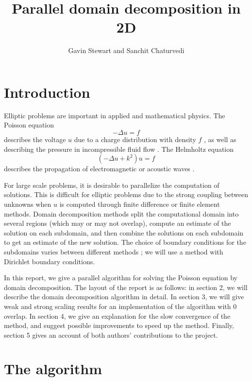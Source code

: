 \documentclass{article}
\title{Parallel domain decomposition in 2D}
\author{Gavin Stewart and Sanchit Chaturvedi}
\begin{document}
	\maketitle
	
	\section{Introduction}
	
	Elliptic problems are important in applied and mathematical physics.  The Poisson equation 
	\begin{equation}
	-\Delta u = f
	\end{equation} describes the voltage \(u\) due to a charge distribution with density \(f\)%
	, as well as describing the pressure in incompressible fluid flow \cite{Marshall97}. The Helmholtz equation
	\begin{equation}
	(-\Delta u + k^2)u = f
	\end{equation} 
	describes the propagation of electromagnetic or acoustic waves \cite{Fairweather03}.
	
	For large scale problems, it is desirable to parallelize the computation of solutions.  This is difficult for elliptic problems due to the strong coupling between unknowns when \(u\) is computed through finite difference or finite element methods.  Domain decomposition methods split the computational domain into several regions (which may or may not overlap), compute an estimate of the solution on each  subdomain, and then combine the solutions on each subdomain to get an estimate of the new solution.  The choice of boundary conditions for the subdomains varies between different methods \cite{Dolean15}; we will use a method with Dirichlet boundary conditions.
	
	In this report, we give a parallel algorithm for solving the Poisson equation by domain decomposition.  The layout of the report is as follows: in section 2, we will describe the domain decomposition algorithm in detail.  In section 3, we will give weak and strong scaling results for an implementation of the algorithm with \(0\) overlap.  In section 4, we give an explanation for the slow convergence of the method, and suggest possible improvements to speed up the method.  Finally, section 5 gives an account of both authors' contributions to the project.
	
	\section{The algorithm}
	
\end{document}
